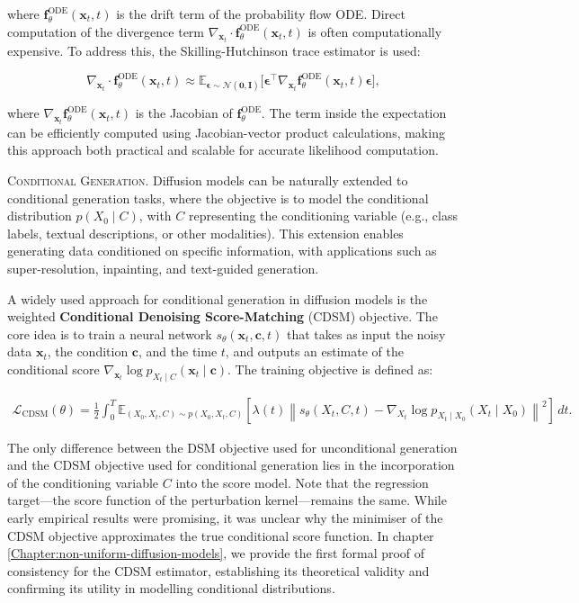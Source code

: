 \noindent where \( \mathbf{f}_\theta^{\text{ODE}}(\mathbf{x}_t, t) \) is the drift term of the probability flow ODE. Direct computation of the divergence term \( \nabla_{\mathbf{x}_t} \cdot \mathbf{f}_\theta^{\text{ODE}}(\mathbf{x}_t, t) \) is often computationally expensive. To address this, the Skilling-Hutchinson trace estimator is used:

\[
\nabla_{\mathbf{x}_t} \cdot \mathbf{f}_\theta^{\text{ODE}}(\mathbf{x}_t, t) \approx \mathbb{E}_{\mathbf{\epsilon} \sim \mathcal{N}(\mathbf{0}, \mathbf{I})} \big[ \mathbf{\epsilon}^\top \nabla_{\mathbf{x}_t} \mathbf{f}_\theta^{\text{ODE}}(\mathbf{x}_t, t) \mathbf{\epsilon} \big],
\]

\noindent where \( \nabla_{\mathbf{x}_t} \mathbf{f}_\theta^{\text{ODE}}(\mathbf{x}_t, t) \) is the Jacobian of \( \mathbf{f}_\theta^{\text{ODE}} \). The term inside the expectation can be efficiently computed using Jacobian-vector product calculations, making this approach both practical and scalable for accurate likelihood computation.


\textsc{Conditional Generation.} Diffusion models can be naturally extended to conditional generation tasks, where the objective is to model the conditional distribution \( p(X_0 \mid C) \), with \( C \) representing the conditioning variable (e.g., class labels, textual descriptions, or other modalities). This extension enables generating data conditioned on specific information, with applications such as super-resolution, inpainting, and text-guided generation.

A widely used approach for conditional generation in diffusion models is the weighted \textbf{Conditional Denoising Score-Matching} (CDSM) objective. The core idea is to train a neural network \( s_\theta(\mathbf{x}_t, \mathbf{c}, t) \) that takes as input the noisy data \( \mathbf{x}_t \), the condition \( \mathbf{c} \), and the time \( t \), and outputs an estimate of the conditional score \( \nabla_{\mathbf{x}_t} \log p_{X_t \mid C}(\mathbf{x}_t \mid \mathbf{c}) \). The training objective is defined as:

\begin{align}
    \mathcal{L}_{\text{CDSM}}(\theta) = 
    \frac{1}{2} \int_0^T \mathbb{E}_{(X_0, X_t, C) \sim p(X_0, X_t, C)} 
    \left[ \lambda(t) \left\| s_\theta(X_t, C, t) - \nabla_{X_t} \log p_{X_t \mid X_0}(X_t \mid X_0) \right\|^2 \right] \, dt.
\end{align}

The only difference between the DSM objective used for unconditional generation and the CDSM objective used for conditional generation lies in the incorporation of the conditioning variable \( C \) into the score model. Note that the regression target—the score function of the perturbation kernel—remains the same. While early empirical results were promising, it was unclear why the minimiser of the CDSM objective approximates the true conditional score function. In chapter \ref{Chapter:non-uniform-diffusion-models}, we provide the first formal proof of consistency for the CDSM estimator, establishing its theoretical validity and confirming its utility in modelling conditional distributions.



